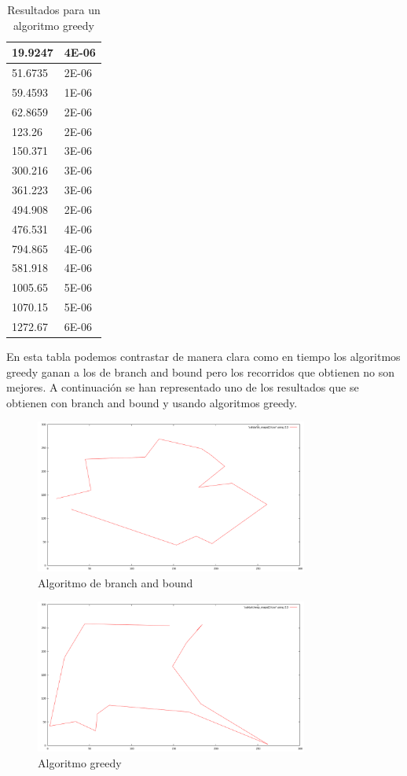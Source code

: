 \documentclass{article}
\begin{document}
\begin{table}[H]
\centering
\caption{Resultados para un algoritmo greedy}
\label{my-label}
\begin{tabular}{|l|l|}
\hline
19.9247 & 4E-06 \\ \hline
51.6735 & 2E-06 \\ \hline
59.4593 & 1E-06 \\ \hline
62.8659 & 2E-06 \\ \hline
123.26  & 2E-06 \\ \hline
150.371 & 3E-06 \\ \hline
300.216 & 3E-06 \\ \hline
361.223 & 3E-06 \\ \hline
494.908 & 2E-06 \\ \hline
476.531 & 4E-06 \\ \hline
794.865 & 4E-06 \\ \hline
581.918 & 4E-06 \\ \hline
1005.65 & 5E-06 \\ \hline
1070.15 & 5E-06 \\ \hline
1272.67 & 6E-06 \\ \hline
\end{tabular}
\end{table}

En esta tabla podemos contrastar de manera clara como en tiempo los
algoritmos greedy ganan a los de branch and bound pero los recorridos
que obtienen no son mejores. A continuación se han representado uno de
los resultados que se obtienen con branch and bound y usando
algoritmos greedy.

\begin{figure}[H]
  \centering
  \includegraphics[width=0.8\textwidth]{bb_mapa15}
  \caption{Algoritmo de branch and bound}
\end{figure}

\begin{figure}[H]
  \centering
  \includegraphics[width=0.8\textwidth]{cheap_mapa15}
  \caption{Algoritmo greedy}
\end{figure}
\end{document}
